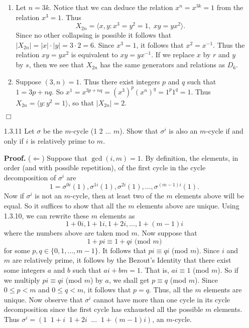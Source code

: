 \documentclass[9pt]{article}
\newcommand{\qed}{\hfill \ensuremath{\Box}}
\newcommand{\cyc}[1]{\langle #1 \rangle}
\begin{document}
\begin{enumerate}
      \begin{enumerate}
         \item Let $n = 3k$. Notice that we can deduce the relation
               $x^n = x^{3k} = 1$ from the relation $x^3 = 1$. Thus
               $$X_{2n} = \cyc{x, y :  x^3 = y^2 = 1, \;xy = yx^2}.$$
               Since no other collapsing is possible it follows that
               $|X_{2n}| = |x| \cdot |y| = 3 \cdot 2 = 6$. Since $x^3 = 1$, it
               follows that $x^2 = x^{-1}$. Thus the relation $xy = yx^2$ is
               equivalent to $xy = yx^{-1}$. If we replace $x$ by $r$ and $y$ by
               $s$, then we see that $X_{2n}$ has the same generators and
               relations as $D_6$.
         \item Suppose $(3, n) = 1$. Thus there exist integers $p$ and $q$ such
               that $1 = 3p + nq$. So
               $x^1 = x^{3p+nq} = (x^3)^p(x^n)^q = 1^p1^q = 1$. Thus
               $X_{2n} = \cyc{y : y^2 = 1}$, so that $|X_{2n}| = 2$.
      \end{enumerate} \qed
   \item[1.3.11]  Let $\sigma$ be the $m$-cycle (1 2 $\ldots$ $m$). Show that
                  $\sigma^i$ is also an $m$-cycle if and only if $i$ is
                  relatively prime to $m$.
                  
      \textbf{Proof.} ($\Leftarrow$) Suppose that $\gcd(i, m) = 1$. By
      definition, the elements, in order (and with possible repetition), of the
      first cycle in the cycle decomposition of $\sigma^i$ are
      $$1 = \sigma^{0i}(1), \sigma^{1i}(1), \sigma^{2i}(1), \ldots,
        \sigma^{(m-1)i}(1).$$
      Now if $\sigma^i$ is not an $m$-cycle, then at least two of the $m$
      elements above will be equal. So it suffices to show that all the $m$
      elements above are unique. Using 1.3.10, we can rewrite these $m$ elements
      as
      $$1+0i, 1+1i, 1+2i, \ldots, 1+(m-1)i$$
      where the numbers above are taken mod $m$. Now suppose that
      $$1 + pi \equiv 1 + qi \mbox{ (mod $m$)}$$
      for some $p, q \in \{0, 1, \ldots, m-1\}$. It follows that
      $pi \equiv qi$ (mod $m$). Since $i$ and $m$ are relatively prime, it
      follows by the Bezout's Identity that there exist some integers $a$ and
      $b$ such that $ai + bm = 1$. That is, $ai \equiv 1$ (mod $m$). So if
      we multiply $pi \equiv qi$ (mod $m$) by $a$, we shall get $p \equiv q$
      (mod $m$). Since $0 \le p < m$ and $0 \le q < m$, it follows that $p = q$.
      Thus, all the $m$ elements are unique. Now observe that $\sigma^i$ cannot
      have more than one cycle in its cycle decomposition since the first cycle
      has exhausted all the possible $m$ elements. Thus
      $\sigma^i = (1\;\;1+i\;\;1+2i\;\;\ldots\;\;1+(m-1)i)$, an $m$-cycle.
      

\end{enumerate}
\end{document}
